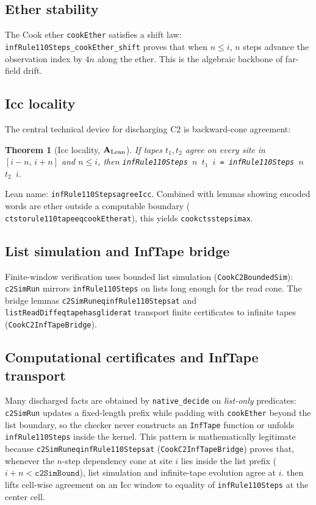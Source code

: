 \documentclass[11pt]{article}
\newtheorem{theorem}{Theorem}[section]
\theoremstyle{remark}
\newcommand{\CatAL}{\ensuremath{\textbf{A}_{\rm Lean}}}
\newcommand{\lean}[1]{%
  \penalty-100
  \begingroup\def\_{\textunderscore\allowbreak}\texttt{#1}\endgroup}
\begin{document}
\subsection{Ether stability}

The Cook ether \texttt{cookEther} satisfies a shift law:
\texttt{infRule110Steps\_cookEther\_shift} proves that when $n \le i$,
$n$ steps advance the observation index by $4n$ along the ether.
This is the algebraic backbone of far-field drift.

\subsection{Icc locality}

The central technical device for discharging C2 is backward-cone agreement:
\begin{theorem}[Icc locality, $\CatAL$]
\label{thm:icc}
If tapes $t_1,t_2$ agree on every site in $[i-n,\, i+n]$ and $n \le i$, then
\texttt{infRule110Steps $n$ $t_1$ $i$ = infRule110Steps $n$ $t_2$ $i$}.
\end{theorem}
\noindent
Lean name: \lean{infRule110Steps\_agree\_Icc}.
Combined with lemmas showing encoded words are ether outside a computable boundary
(\lean{cts\_to\_rule110\_tape\_eq\_cookEther\_at}), this yields \lean{cook\_cts\_step\_sim\_ax}.

\subsection{List simulation and InfTape bridge}

Finite-window verification uses bounded list simulation (\texttt{CookC2BoundedSim}):
\texttt{c2SimRun} mirrors \texttt{infRule110Steps} on lists long enough for the read cone.
The bridge lemmas \lean{c2SimRun\_eq\_infRule110Steps\_at} and
\lean{listReadDiff\_eq\_tape\_has\_glider\_at} transport finite certificates to infinite tapes
(\texttt{CookC2InfTapeBridge}).

\subsection{Computational certificates and InfTape transport}
\label{sec:comp-cert}

Many discharged facts are obtained by \texttt{native\_decide} on \emph{list-only} predicates:
\texttt{c2SimRun} updates a fixed-length prefix while padding with \texttt{cookEther} beyond
the list boundary, so the checker never constructs an \texttt{InfTape} function or unfolds
\texttt{infRule110Steps} inside the kernel.
This pattern is mathematically legitimate because \lean{c2SimRun\_eq\_infRule110Steps\_at}
(\texttt{CookC2InfTapeBridge}) proves that, whenever the $n$-step dependency cone at site $i$
lies inside the list prefix ($i + n < \texttt{c2SimBound}$), list simulation and infinite-tape
evolution agree at $i$.
 then lifts cell-wise agreement on an Icc window to equality of
\texttt{infRule110Steps} at the center cell.
\end{document}
